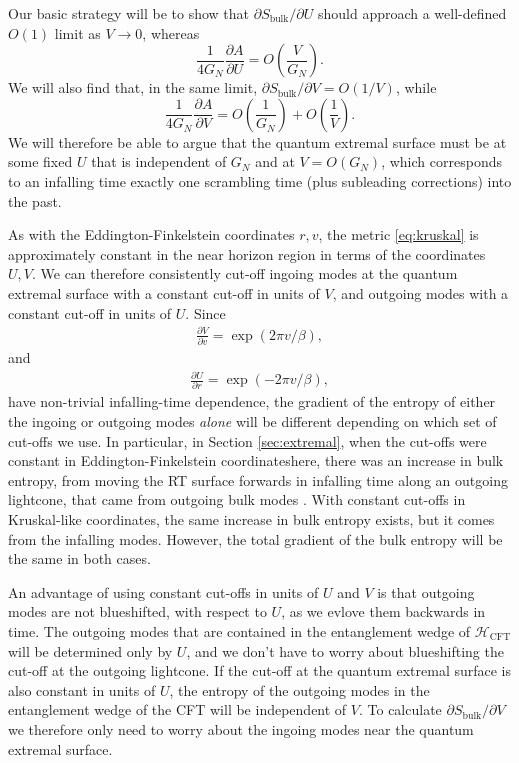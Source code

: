 \documentclass[11pt,a4paper]{article}
\begin{document}
Our basic strategy will be to show that $\partial S_\text{bulk}/ \partial U$ should approach a well-defined $O(1)$ limit as $V \to 0$, whereas $$
\frac{1}{4G_N} \frac{\partial A}{ \partial U} = O\left(\frac{V}{ G_N}\right).
$$
We will also find that, in the same limit, $\partial S_\text{bulk}/ \partial V = O(1/V)$, while $$\frac{1}{4G_N}  \frac{\partial A}{ \partial V} = O\left(\frac{1}{G_N}\right) + O\left(\frac{1}{V}\right).$$ We will therefore be able to argue that the quantum extremal surface must be at some fixed $U$ that is independent of $G_N$ and at $V = O(G_N)$, which corresponds to an infalling time exactly one scrambling time (plus subleading corrections) into the past.

As with the Eddington-Finkelstein coordinates $r, v$, the metric \eqref{eq:kruskal} is approximately constant in the near horizon region in terms of the coordinates $U, V$. We can therefore consistently cut-off ingoing modes at the quantum extremal surface with a constant cut-off in units of $V$, and outgoing modes with a constant cut-off in units of $U$. Since
\begin{align} \label{eq:dVdv}
\frac{\partial V}{\partial v} =  \exp(2 \pi v /\beta),
\end{align}
and
\begin{align}
\frac{\partial U}{\partial r} = \exp(-2 \pi v /\beta),
\end{align}
have non-trivial infalling-time dependence, the gradient of the entropy of either the ingoing or outgoing modes \emph{alone} will be different depending on which set of cut-offs we use. In particular, in Section \ref{sec:extremal}, when the cut-offs were constant in Eddington-Finkelstein coordinateshere, there was an increase in bulk entropy, from moving the RT surface forwards in infalling time along an outgoing lightcone, that came from outgoing bulk modes . With constant cut-offs in Kruskal-like coordinates, the same increase in bulk entropy exists, but it comes from the infalling modes. However, the total gradient of the bulk entropy will be the same in both cases.

An advantage of using constant cut-offs in units of $U$ and $V$ is that outgoing modes are not blueshifted, with respect to $U$, as we evlove them backwards in time. The outgoing modes that are contained in the entanglement wedge of $\mathcal{H}_\text{CFT}$ will be determined only by $U$, and we don't have to worry about blueshifting the cut-off at the outgoing lightcone. If the cut-off at the quantum extremal surface is also constant in units of $U$, the entropy of the outgoing modes in the entanglement wedge of the CFT will be independent of $V$. To calculate $\partial S_\text{bulk}/\partial V$ we therefore only need to worry about the ingoing modes near the quantum extremal surface. 
\end{document}

